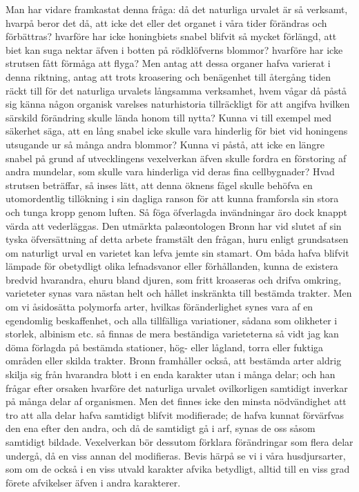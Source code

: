 Man har vidare framkastat denna fråga: då det naturliga urvalet är så verksamt, hvarpå beror det då, att icke det eller det organet i våra tider förändras och förbättras? hvarföre har icke honingbiets snabel blifvit så mycket förlängd, att biet kan suga nektar äfven i botten på rödklöfverns blommor? hvarföre har icke strutsen fått förmåga att flyga? Men antag att dessa organer hafva varierat i denna riktning, antag att trots kroasering och benägenhet till återgång tiden räckt till för det naturliga urvalets långsamma verksamhet, hvem vågar då påstå sig känna någon organisk varelses naturhistoria tillräckligt för att angifva hvilken särskild förändring skulle lända honom till nytta? Kunna vi till exempel med säkerhet säga, att en lång snabel icke skulle vara hinderlig för biet vid honingens utsugande ur så många andra blommor? Kunna vi påstå, att icke en längre snabel på grund af utvecklingens vexelverkan äfven skulle fordra en förstoring af andra mundelar, som skulle vara hinderliga vid deras fina cellbygnader? Hvad strutsen beträffar, så inses lätt, att denna öknens fågel skulle behöfva en utomordentlig tillökning i sin dagliga ranson för att kunna framforsla sin stora och tunga kropp genom luften. Så föga öfverlagda invändningar äro dock knappt värda att vederläggas.
Den utmärkta palæontologen Bronn har vid slutet af sin tyska öfversättning af detta arbete framstält den frågan, huru enligt grundsatsen om naturligt urval en varietet kan lefva jemte sin stamart. Om båda hafva blifvit lämpade för obetydligt olika lefnadsvanor eller förhållanden, kunna de existera bredvid hvarandra, ehuru bland djuren, som fritt kroaseras och drifva omkring, varieteter synas vara nästan helt och hållet inskränkta till bestämda trakter. Men om vi åsidosätta polymorfa arter, hvilkas föränderlighet synes vara af en egendomlig beskaffenhet, och alla tillfälliga variationer, sådana som olikheter i storlek, albinism etc. så finnas de mera beständiga varieteterna så vidt jag kan döma förlagda på bestämda stationer, hög- eller lågland, torra eller fuktiga områden eller skilda trakter. Bronn framhåller också, att bestämda arter aldrig skilja sig från hvarandra blott i en enda karakter utan i många delar; och han frågar efter orsaken hvarföre det naturliga urvalet ovilkorligen samtidigt inverkar på många delar af organismen. Men det finnes icke den minsta nödvändighet att tro att alla delar hafva samtidigt blifvit modifierade; de hafva kunnat förvärfvas den ena efter den andra, och då de samtidigt gå i arf, synas de oss såsom samtidigt bildade. Vexelverkan bör dessutom förklara förändringar som flera delar undergå, då en viss annan del modifieras. Bevis härpå se vi i våra husdjursarter, som om de också i en viss utvald karakter afvika betydligt, alltid till en viss grad förete afvikelser äfven i andra karakterer.

